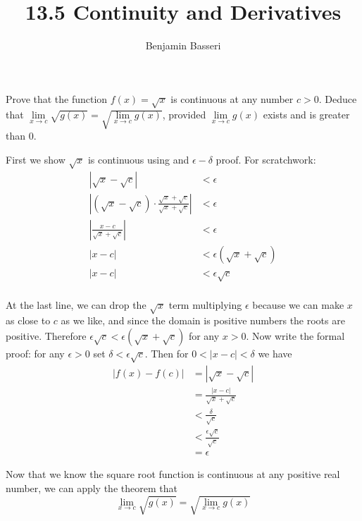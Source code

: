 \documentclass{article}
\title{13.5 Continuity and Derivatives}
\author{Benjamin Basseri}
\begin{document}
\maketitle
\begin{problem}
Prove that the function $f(x) = \sqrt{x}$ is continuous at any number $c > 0$. Deduce that $\lim\limits_{x\to c}\sqrt{g(x)} = \sqrt{\lim\limits_{x \to c} g(x)}$, provided $\lim\limits_{x \to c} g(x)$ exists and is greater than 0.
\end{problem}

First we show $\sqrt{x}$ is continuous using and $\epsilon-\delta$ proof. For scratchwork:
\begin{align*}
  |\sqrt{x} - \sqrt{c} |                                                       & < \epsilon                      \\
  |(\sqrt{x} - \sqrt{c})\cdot \frac{\sqrt{x} + \sqrt{c}}{\sqrt{x} + \sqrt{c}}| & < \epsilon                      \\
  |\frac{x - c}{\sqrt{x} + \sqrt{c}}|                                          & < \epsilon                      \\
  |x - c|                                                                      & < \epsilon(\sqrt{x} + \sqrt{c}) \\
  |x - c|                                                                      & < \epsilon\sqrt{c}              \\
\end{align*}

At the last line, we can drop the $\sqrt{x}$ term multiplying $\epsilon$ because we can make $x$ as close to $c$ as we like, and since the domain is positive numbers the roots are positive. Therefore $\epsilon\sqrt{c} < \epsilon(\sqrt{x} + \sqrt{c})$ for any $x > 0$. Now write the formal proof: for any $\epsilon > 0$ set $\delta < \epsilon\sqrt{c}$. Then for $0 < |x - c| < \delta$ we have
\begin{align*}
  |f(x) - f(c)| & = |\sqrt{x} - \sqrt{c}|               \\
                & = \frac{|x - c|}{\sqrt{x} + \sqrt{c}} \\
                & < \frac{\delta}{\sqrt{c}}             \\
                & < \frac{\epsilon\sqrt{c}}{\sqrt{c}}   \\
                & = \epsilon
\end{align*}

Now that we know the square root function is continuous at any positive real number, we can apply the theorem that
$$\lim_{x \to c} \sqrt{g(x)} = \sqrt{\lim_{x \to c} g(x)}$$
\end{document}

